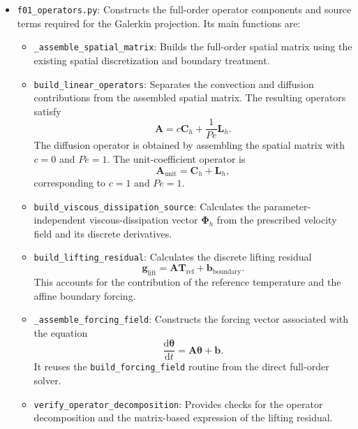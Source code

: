 \begin{itemize}

    \item \texttt{f01\_operators.py}: Constructs the full-order
    operator components and source terms required for the
    Galerkin projection. Its main functions are:

    \begin{itemize}
        \item \texttt{\_assemble\_spatial\_matrix}: Builds the
        full-order spatial matrix using the existing spatial
        discretization and boundary treatment.

        \item \texttt{build\_linear\_operators}: Separates the
        convection and diffusion contributions from the
        assembled spatial matrix. The resulting operators
        satisfy
        \[
            \mathbf{A}
            =
            c\mathbf{C}_h+\frac{1}{Pe}\mathbf{L}_h.
        \]
        The diffusion operator is obtained by assembling
        the spatial matrix with $c=0$ and $Pe=1$. The
        unit-coefficient operator is
        \[
            \mathbf{A}_{\mathrm{unit}}
            =
            \mathbf{C}_h+\mathbf{L}_h,
        \]
        corresponding to $c=1$ and $Pe=1$.

        \item \texttt{build\_viscous\_dissipation\_source}:
        Calculates the parameter-independent viscous-dissipation
        vector $\boldsymbol{\Phi}_h$ from the prescribed
        velocity field and its discrete derivatives.

        \item \texttt{build\_lifting\_residual}: Calculates
        the discrete lifting residual
        \[
            \mathbf{g}_{\mathrm{lift}}
            =
            \mathbf{A}\mathbf{T}_{\mathrm{ref}}
            +\mathbf{b}_{\mathrm{boundary}}.
        \]
        This accounts for the contribution of the reference
        temperature and the affine boundary forcing.

        \item \texttt{\_assemble\_forcing\_field}: Constructs
        the forcing vector associated with the equation
        \[
            \frac{\mathrm{d}\boldsymbol{\theta}}{\mathrm{d}t}
            =
            \mathbf{A}\boldsymbol{\theta}+\mathbf{b}.
        \]
        It reuses the \texttt{build\_forcing\_field} routine
        from the direct full-order solver.

        \item \texttt{verify\_operator\_decomposition}:
        Provides checks for the operator decomposition and
        the matrix-based expression of the lifting residual.


\end{itemize}
\end{itemize}

